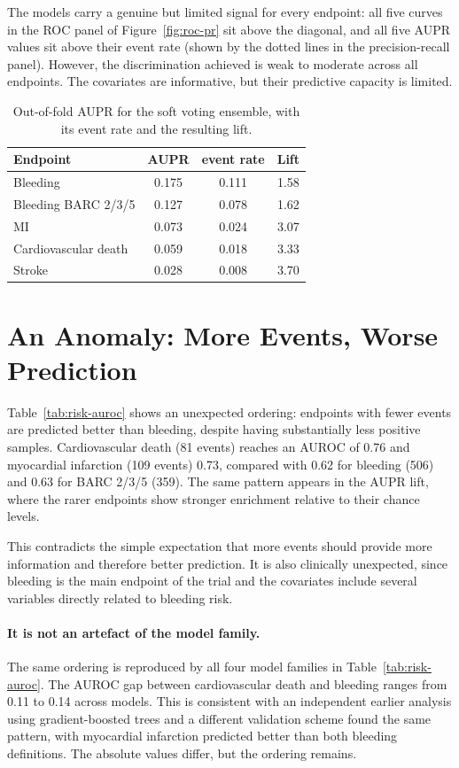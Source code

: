 The models carry a genuine but limited signal for every endpoint: all five curves  in the ROC
panel of Figure~\ref{fig:roc-pr} sit above the diagonal, and all five AUPR
values sit above their event rate (shown by the dotted lines in the precision-recall
panel). However, the discrimination achieved is weak to moderate across all
endpoints. The covariates are informative, but their predictive capacity is limited.


\begin{table}[h]
\centering
\caption{Out-of-fold AUPR for the soft voting ensemble, with its event rate and the resulting lift.}
\label{tab:risk-auprc}
\begin{tabular}{lccc}
\toprule
Endpoint & AUPR & event rate & Lift \\
\midrule
Bleeding             & 0.175 & 0.111 & 1.58 \\
Bleeding BARC 2/3/5  & 0.127 & 0.078 & 1.62 \\
MI                   & 0.073 & 0.024 & 3.07 \\
Cardiovascular death & 0.059 & 0.018 & 3.33 \\
Stroke               & 0.028 & 0.008 & 3.70 \\
\bottomrule
\end{tabular}
\end{table}

\section{An Anomaly: More Events, Worse Prediction}

Table~\ref{tab:risk-auroc} shows an unexpected ordering: endpoints with fewer events are predicted better than bleeding, 
despite having substantially less positive samples. Cardiovascular death (81 events) reaches an AUROC of 0.76 
and myocardial infarction (109 events) 0.73, compared with 0.62 for bleeding (506) and 0.63 for BARC 2/3/5 (359). 
The same pattern appears in the AUPR lift, where the rarer endpoints show
stronger enrichment relative to their chance levels.

This contradicts the simple expectation that more events should provide more 
information and therefore better prediction. It is also clinically unexpected, 
since bleeding is the main endpoint of the trial and the covariates include several 
variables directly related to bleeding risk.

\paragraph{It is not an artefact of the model family.}
The same ordering is reproduced by all four model families in Table~\ref{tab:risk-auroc}. 
The AUROC gap between cardiovascular death and bleeding ranges from 0.11 to 0.14 across models. 
This is consistent with an independent earlier analysis \citep{maroni2026} using gradient-boosted trees and a different validation scheme
found the same pattern, with myocardial infarction predicted better than both bleeding definitions.
The absolute values differ, but the ordering remains.

